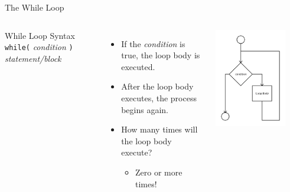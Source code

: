 \documentclass[xcolor=table]{beamer}
\begin{document}
\begin{frame}[fragile]{The While Loop}
  \begin{columns}

    \begin{block}{While Loop Syntax}
      \verb!while(! \textit{condition} \verb!)! 
      \newline\verb!    ! \textit{statement/block}
    \end{block}
    
    \vspace{0.5cm}

    \begin{itemize}[<+(1)->]
      \item If the \textit{condition} is true, the loop body is executed.
      \item After the loop body executes, the process begins again.
      \item How many times will the loop body execute?
      \begin{itemize}
          \item Zero or more times!
      \end{itemize}
    \end{itemize}

    \begin{center}
      \includegraphics[width=0.8\textwidth]{images/while}
    \end{center}
  \end{columns}
\end{frame}
\end{document}
